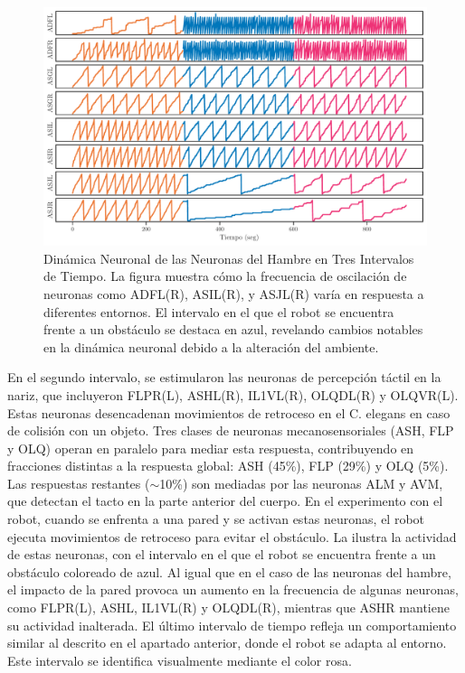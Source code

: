 \begin{figure}[h!]
	\centering\includegraphics[width=\imsize]{intervalos_hambre.pdf}
	\caption[   Dinámica Neuronal de las Neuronas del Hambre en Tres Intervalos de Tiempo. ]{  Dinámica Neuronal de las Neuronas del Hambre en Tres Intervalos de Tiempo. La figura muestra cómo la frecuencia de oscilación de neuronas como ADFL(R), ASIL(R), y ASJL(R) varía en respuesta a diferentes entornos. El intervalo en el que el robot se encuentra frente a un obstáculo se destaca en azul, revelando cambios notables en la dinámica neuronal debido a la alteración del ambiente. }\label{fig:intervalos_hambre}
\end{figure}

En el segundo intervalo, se estimularon las neuronas de percepción táctil en la nariz, que incluyeron FLPR(L), ASHL(R), IL1VL(R), OLQDL(R) y OLQVR(L). Estas neuronas desencadenan movimientos de retroceso en el C. elegans en caso de colisión con un objeto. Tres clases de neuronas mecanosensoriales (ASH, FLP y OLQ) operan en paralelo para mediar esta respuesta, contribuyendo en fracciones distintas a la respuesta global: ASH (45\%), FLP (29\%) y OLQ (5\%). Las respuestas restantes ($\sim$10\%) son mediadas por las neuronas ALM y AVM, que detectan el tacto en la parte anterior del cuerpo. En el experimento con el robot, cuando se enfrenta a una pared y se activan estas neuronas, el robot ejecuta movimientos de retroceso para evitar el obstáculo. La  ilustra la actividad de estas neuronas, con el intervalo en el que el robot se encuentra frente a un obstáculo coloreado de azul. Al igual que en el caso de las neuronas del hambre, el impacto de la pared provoca un aumento en la frecuencia de algunas neuronas, como FLPR(L), ASHL, IL1VL(R) y OLQDL(R), mientras que ASHR mantiene su actividad inalterada. El último intervalo de tiempo refleja un comportamiento similar al descrito en el apartado anterior, donde el robot se adapta al entorno. Este intervalo se identifica visualmente mediante el color rosa.

